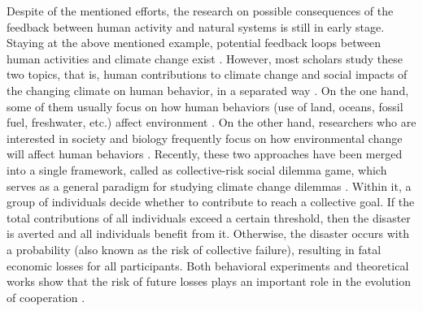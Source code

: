\documentclass[9pt]{elife}
\begin{document}
Despite of the mentioned efforts, the research on possible consequences of the feedback between human activity and natural systems is still in early stage. Staying at the above mentioned example, potential feedback loops between human activities and climate change exist \citep{obradovich2019risk}. However, most scholars study these two topics, that is, human contributions to climate change and social impacts of the changing climate on human behavior, in a separated way \citep{vitousek1997human,barfuss2020caring}. On the one hand, some of them usually focus on how human behaviors (use of land, oceans, fossil fuel, freshwater, etc.) affect environment \citep{vitousek1997human}. On the other hand, researchers who are interested in society and biology frequently focus on how environmental change will affect human behaviors \citep{culler2015warmer,obradovich2019risk,celik2020effects}. Recently, these two approaches have been merged into a single framework, called as collective-risk social dilemma game, which serves as a general paradigm for studying climate change dilemmas \citep{milinski2008collective}. Within it, a group of individuals decide whether to contribute to reach a collective goal. If the total contributions of all individuals exceed a certain threshold, then the disaster is averted and all individuals benefit from it. Otherwise, the disaster occurs with a probability (also known as the risk of collective failure), resulting in fatal economic losses for all participants. Both behavioral experiments and theoretical works show that the risk of future losses plays an important role in the evolution of cooperation \citep{milinski2008collective,santos2011risk,chen2012risk,vasconcelos2013bottom,hilbe2013evolution,vasconcelos2014climate,barfuss2020caring,domingos2020timing,sun2021combination,chica2022cooperation}.
\end{document}
